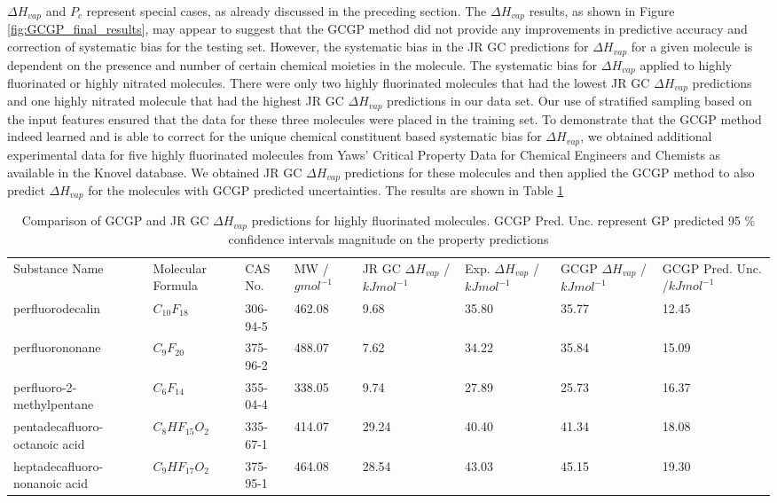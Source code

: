 \documentclass[journal=jacsat,manuscript=article]{achemso}
\begin{document}
$\Delta H_{vap}$ and $P_c$ represent special cases, as already discussed in the preceding section. The $\Delta H_{vap}$ results, as shown in Figure \ref{fig:GCGP_final_results}, may appear to suggest that the GCGP method did not provide any improvements in predictive accuracy and correction of systematic bias for the testing set. However, the systematic bias in the JR GC predictions for $\Delta H_{vap}$ for a given molecule is dependent on the presence and number of certain chemical moieties in the molecule. The systematic bias for $\Delta H_{vap}$ applied to highly fluorinated or highly nitrated molecules. There were only two highly fluorinated molecules that had the lowest JR GC $\Delta H_{vap}$ predictions and one highly nitrated molecule that had the highest JR GC $\Delta H_{vap}$ predictions in our data set. Our use of stratified sampling based on the input features ensured that the data for these three molecules were placed in the training set. To demonstrate that the GCGP method indeed learned and is able to correct for the unique chemical constituent based systematic bias for $\Delta H_{vap}$, we obtained additional experimental data for five highly fluorinated molecules from Yaws' Critical Property Data for Chemical Engineers and Chemists as available in the Knovel database.
We obtained JR GC $\Delta H_{vap}$ predictions for these molecules and then applied the GCGP method to also predict $\Delta H_{vap}$ for the molecules with GCGP predicted uncertainties. The results are shown in Table \ref{tab:Hvap_pred_fluorinated_mols}

\vspace{0.3cm}

\begin{table}[H]
\centering
\begin{tabular}{p{2.9cm}p{1.8cm}p{1.6cm}p{1.5cm}p{1.6cm}p{1.6cm}p{1.6cm}p{1.6cm}} 
Substance Name&  Molecular Formula&  CAS No.&  MW /$gmol^{-1}$&  JR GC $\Delta H_{vap}$ /$kJmol^{-1}$&  Exp. $\Delta H_{vap}$ /$kJmol^{-1}$&  GCGP $\Delta H_{vap}$ /$kJmol^{-1}$& GCGP Pred. Unc. /$kJmol^{-1}$ 


\\
         perfluorodecalin&  $C_{10}F_{18}$&  306-94-5&  462.08&  9.68&  35.80&  35.77& 12.45
\\
         perfluorononane&  $C_{9}F_{20}$&  375-96-2&  488.07&  7.62&  34.22&  35.84& 15.09
\\
         perfluoro-2-methylpentane&  $C_{6}F_{14}$&  355-04-4&  338.05&  9.74&  27.89&  25.73& 16.37
\\
         pentadecafluoro-octanoic acid&  $C_{8}HF_{15}O_{2}$&  335-67-1&  414.07&  29.24&  40.40&  41.34& 18.08
\\
         heptadecafluoro-nonanoic acid&  $C_{9}HF_{17}O_{2}$&  375-95-1&  464.08&  28.54&  43.03&  45.15& 19.30
\\
\end{tabular}
\caption{Comparison of GCGP and JR GC $\Delta H_{vap}$ predictions for highly fluorinated molecules. GCGP Pred. Unc. represent GP predicted 95 \% confidence intervals magnitude on the property predictions}
\label{tab:Hvap_pred_fluorinated_mols}
\end{table}
\end{document}
